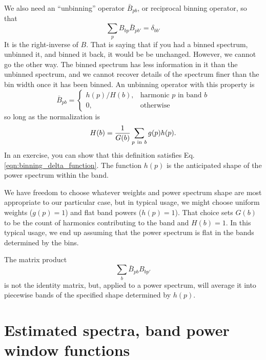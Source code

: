 We also need an ``unbinning'' operator $\bar B_{pb}$, or reciprocal binning operator, so that
\begin{equation}
  \sum_p B_{bp}\bar B_{pb'} = \delta_{bb'}  \label{eqn:binning_delta_function}
\end{equation}
It is the right-inverse of $B$.  That is saying that if you had a binned spectrum, unbinned it, and binned it back, it would be be unchanged.  However, we cannot go the other way.  The binned spectrum has less information in it than the unbinned spectrum, and we cannot recover details of the spectrum finer than the bin width once it has been binned.    An unbinning operator with this property is
\begin{equation}
  \bar B_{pb} = \left\{
  \begin{array}{ll}
   {h(p)/H(b)}, &  \mbox{harmonic $p$ in band $b$} \\
   0, & \mbox{otherwise}
  \end{array} 
  \right.
\end{equation}
so long as the normalization is 
\begin{equation}
  H(b) = \frac{1}{G(b)}\sum_{p\ {\rm in}\ b}g(p)h(p).
\end{equation}
In an exercise, you can show that this definition satisfies Eq. \ref{eqn:binning_delta_function}.  The function $h(p)$ is the anticipated shape of the power spectrum within the band.

We have freedom to choose whatever weights and power spectrum shape are most appropriate to our particular case, but in typical usage, we might choose uniform weights ($g(p) = 1$) and flat band powers ($h(p)=1$).  That choice sets $G(b)$ to be the count of harmonics contributing to the band and $H(b) = 1$.  In this typical usage, we end up assuming that the power spectrum is flat in the bands determined by the bins.

The matrix product
\begin{equation}
  \sum_b \bar B_{pb}B_{bp'} 
\end{equation}
is not the identity matrix, but, applied to a power spectrum, will average it into piecewise bands of the specified shape determined by $h(p)$.


\section{Estimated spectra, band power window functions}

